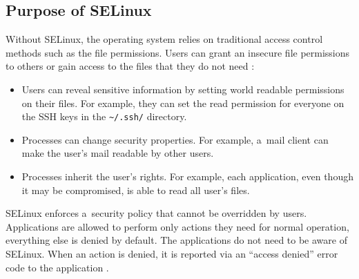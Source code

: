 \subsection{Purpose of SELinux}
Without SELinux, the operating system relies on traditional access control
methods such as the file permissions. Users can grant an insecure file
permissions to others or gain access to the files that they do not need
\cite{selinuxguide}:
\begin{itemize}
    \item Users can reveal sensitive information by setting world readable
        permissions on their files. For example, they can set the read
        permission for everyone on the SSH keys in the
        \texttt{\textasciitilde/.ssh/} directory.
    \item Processes can change security properties. For example, a~mail client
        can make the user's mail readable by other users.
    \item Processes inherit the user's rights. For example, each application,
        even though it may be compromised, is able to read all user's files.
\end{itemize}

SELinux enforces a~security policy that cannot be overridden by users.
Applications are allowed to perform only actions they need for normal operation,
everything else is denied by default. The applications do not need to be aware
of SELinux. When an action is denied, it is reported via an ``access denied''
error code to the application \cite{centoshowto}.

%
%    
%
%

